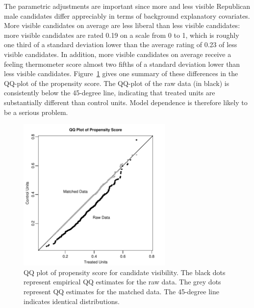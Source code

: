 \documentclass[11pt,titlepage]{article}
\begin{document}
The parametric adjustments are important since more and less visible
Republican male candidates differ appreciably in terms of background
explanatory covariates.  More visible candidates on average are less
liberal than less visible candidates: more visible candidates are
rated 0.19 on a scale from 0 to 1, which is roughly one third of a
standard deviation lower than the average rating of 0.23 of less
visible candidates.  In addition, more visible candidates on average
receive a feeling thermometer score almost two fifths of a standard
deviation lower than less visible candidates.  Figure~\ref{fg:kochQQ}
gives one summary of these differences in the QQ-plot of the
propensity score.  The QQ-plot of the raw data (in black) is
consistently below the 45-degree line, indicating that treated units
are substantially different than control units.  Model dependence is
therefore likely to be a serious problem.
\begin{figure}[t] 
 \begin{center}
   \includegraphics[height=3in,angle=0]{figs/kochqq.pdf}
 \end{center} 
 \vspace{-0.275in}
 \caption{QQ plot of propensity score for candidate visibility. The
   black dots represent empirical QQ estimates for the raw data.  The
   grey dots represent QQ estimates for the matched data.  The
   45-degree line indicates identical distributions.}
 \label{fg:kochQQ}
\end{figure}
\end{document}
